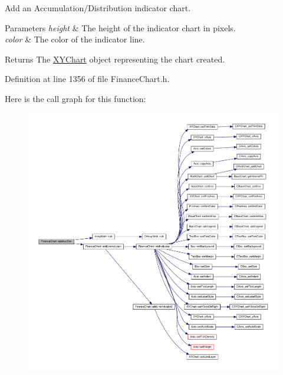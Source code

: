 Add an Accumulation/\+Distribution indicator chart. 


\begin{DoxyParams}{Parameters}
{\em height} & The height of the indicator chart in pixels.\\
\hline
{\em color} & The color of the indicator line.\\
\hline
\end{DoxyParams}
\begin{DoxyReturn}{Returns}
The \hyperlink{class_x_y_chart}{X\+Y\+Chart} object representing the chart created.
\end{DoxyReturn}


Definition at line 1356 of file Finance\+Chart.\+h.

Here is the call graph for this function\+:
\nopagebreak
\begin{figure}[H]
\begin{center}
\leavevmode
\includegraphics[width=350pt]{class_finance_chart_ae5545f015ca900f2b1300c675f249186_cgraph}
\end{center}
\end{figure}
\mbox{\label{class_finance_chart_ad160627b8abe9c8c14175c93e4e54113}} 
